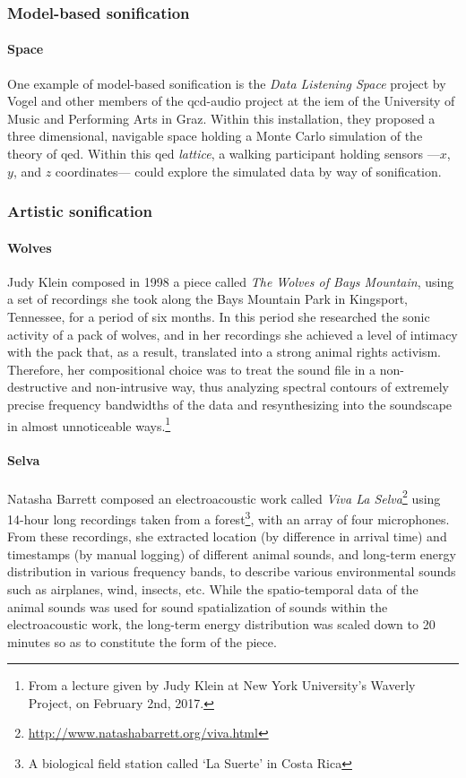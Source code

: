 \subsubsection{Model-based sonification}
\label{sonification:model}

\paragraph{Space}
One example of model-based sonification is the \textit{Data Listening Space} project by Vogel and other members of the \gls{qcd-audio} project \parencite{icmc/bbp2372.2012.096} at the \gls{iem} of the University of Music and Performing Arts in Graz. Within this installation, they proposed a three dimensional, navigable space holding a Monte Carlo simulation of the theory of \gls{qed}. Within this \gls{qed} \textit{lattice}, a walking participant holding sensors ---$x$, $y$, and $z$ coordinates--- could explore the simulated data by way of sonification.

\subsubsection{Artistic sonification}
\label{sonification:artistic}

\paragraph{Wolves}
Judy Klein composed in 1998 a piece called \textit{The Wolves of Bays Mountain}, using a set of recordings she took along the Bays Mountain Park in Kingsport, Tennessee, for a period of six months. In this period she researched the sonic activity of a pack of wolves, and in her recordings she achieved a level of intimacy with the pack that, as a result, translated into a strong animal rights activism. Therefore, her compositional choice was to treat the sound file in a non-destructive and non-intrusive way, thus analyzing spectral contours of extremely precise frequency bandwidths of the data and resynthesizing into the soundscape in almost unnoticeable ways.\footnote{From a lecture given by Judy Klein at New York University's Waverly Project, on February 2nd, 2017.}

\paragraph{Selva}
Natasha Barrett \parencite{icmc/bbp2372.2000.123} composed an electroacoustic work called \textit{Viva La Selva}\footnote{\url{http://www.natashabarrett.org/viva.html}} using 14-hour long recordings taken from a forest\footnote{A biological field station called `La Suerte' in Costa Rica}, with an array of four microphones. From these recordings, she extracted location (by difference in arrival time) and timestamps (by manual logging) of different animal sounds, and long-term energy distribution in various frequency bands, to describe various environmental sounds such as airplanes, wind, insects, etc. While the spatio-temporal data of the animal sounds was used for sound spatialization of sounds within the electroacoustic work, the long-term energy distribution was scaled down to 20 minutes so as to constitute the form of the piece.

